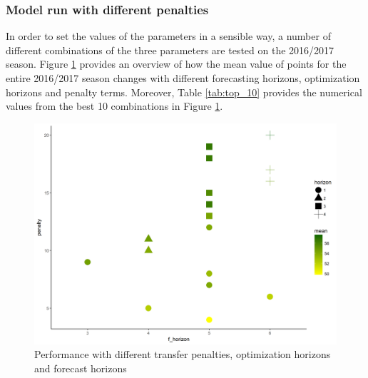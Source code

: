 \subsubsection{Model run with different penalties}
In order to set the values of the parameters in a sensible way, a number of different combinations of the three parameters are tested on the 2016/2017 season. Figure \ref{Parameter_choice} provides an overview of how the mean value of points for the entire 2016/2017 season changes with different forecasting horizons, optimization horizons and penalty terms. Moreover, Table \ref{tab:top_10} provides the numerical values from the best 10 combinations in Figure \ref{Parameter_choice}.


\newpar

\begin{figure}[H]
    \centering
    \includegraphics[scale=0.45]{fig/chapter_6/paramter_choice.png}
    \caption{Performance with different transfer penalties, optimization horizons and forecast horizons}
\label{Parameter_choice}    
\end{figure}

